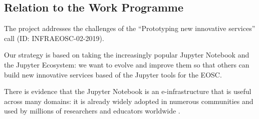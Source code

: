 %

\subsection{Relation to the Work Programme}

The \TheProject project addresses the challenges of the ``Prototyping
new innovative services'' call (ID: INFRAEOSC-02-2019).

Our strategy is based on taking the increasingly popular Jupyter
Notebook and the Jupyter Ecosystem: we want to evolve and improve them
so that others can build new innovative services based of the Jupyter
tools for the EOSC.
\medskip

There is evidence that the Jupyter Notebook is an e-infrastructure
that is useful across many domains: it is already widely adopted in
numerous communities and used by millions of researchers and educators worldwide
\cite{jupyter-grant}.

